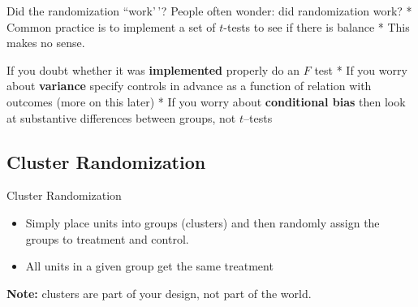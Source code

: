 \documentclass[
  11pt,
  ignorenonframetext,
]{beamer}
\providecommand{\tightlist}{%
  \setlength{\itemsep}{0pt}\setlength{\parskip}{0pt}}\usepackage{longtable,booktabs,array}
\begin{document}
\begin{frame}{Did the randomization ``work'\,'?}
\protect\hypertarget{did-the-randomization-work}{}
\footnotesize * People often wonder: did randomization work? * Common
practice is to implement a set of \(t\)-tests to see if there is balance
* This makes no sense.

\footnotesize * If you doubt whether it was \textbf{implemented}
properly do an \(F\) test * If you worry about \textbf{variance} specify
controls in advance as a function of relation with outcomes (more on
this later) * If you worry about \textbf{conditional bias} then look at
substantive differences between groups, not \(t\)--tests
\end{frame}

\hypertarget{cluster-randomization}{%
\subsection{Cluster Randomization}\label{cluster-randomization}}

\begin{frame}{Cluster Randomization}
\protect\hypertarget{cluster-randomization-1}{}
\begin{itemize}
\tightlist
\item
  Simply place units into groups (clusters) and then randomly assign the
  groups to treatment and control.
\item
  All units in a given group get the same treatment
\end{itemize}

\textbf{Note:} clusters are part of your design, not part of the world.
\end{frame}
\end{document}
